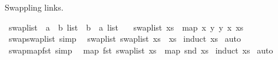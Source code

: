 \begin{isabellebody}
\begin{isamarkuptext}
Swappling links.%
\end{isamarkuptext}\isamarkuptrue%
\isamarkupfalse%
\ swap{\isacharunderscore}{\kern0pt}list\ {\isacharcolon}{\kern0pt}{\isacharcolon}{\kern0pt}\ {\isachardoublequoteopen}{\isacharparenleft}{\kern0pt}{\isacharprime}{\kern0pt}a\ {\isacharasterisk}{\kern0pt}\ {\isacharprime}{\kern0pt}b{\isacharparenright}{\kern0pt}\ list\ {\isacharequal}{\kern0pt}{\isachargreater}{\kern0pt}\ {\isacharparenleft}{\kern0pt}{\isacharprime}{\kern0pt}b\ {\isacharasterisk}{\kern0pt}\ {\isacharprime}{\kern0pt}a{\isacharparenright}{\kern0pt}\ list{\isachardoublequoteclose}\isanewline
\ \ \ {\isachardoublequoteopen}swap{\isacharunderscore}{\kern0pt}list\ xs\ {\isasymequiv}\ map\ {\isacharparenleft}{\kern0pt}{\isasymlambda}{\isacharparenleft}{\kern0pt}x{\isacharcomma}{\kern0pt}\ y{\isacharparenright}{\kern0pt}{\isachardot}{\kern0pt}\ {\isacharparenleft}{\kern0pt}y{\isacharcomma}{\kern0pt}\ x{\isacharparenright}{\kern0pt}{\isacharparenright}{\kern0pt}\ xs{\isachardoublequoteclose}\isanewline
\isanewline
{}\isamarkupfalse%
\ swap{\isacharunderscore}{\kern0pt}swap{\isacharunderscore}{\kern0pt}list\ {\isacharbrackleft}{\kern0pt}simp{\isacharbrackright}{\kern0pt}{\isacharcolon}{\kern0pt}\isanewline
\ \ {\isachardoublequoteopen}swap{\isacharunderscore}{\kern0pt}list\ {\isacharparenleft}{\kern0pt}swap{\isacharunderscore}{\kern0pt}list\ xs{\isacharparenright}{\kern0pt}\ {\isacharequal}{\kern0pt}\ xs{\isachardoublequoteclose}\isanewline
%
\isadelimproof
%
\endisadelimproof
%
\isatagproof
{}\isamarkupfalse%
\ {\isacharparenleft}{\kern0pt}induct\ xs{\isacharparenright}{\kern0pt}\isanewline
{}\isamarkupfalse%
\ auto%
\endisatagproof
{\isafoldproof}%
%
\isadelimproof
\isanewline
%
\endisadelimproof
\isanewline
{}\isamarkupfalse%
\ swap{\isacharunderscore}{\kern0pt}map{\isacharunderscore}{\kern0pt}fst\ {\isacharbrackleft}{\kern0pt}simp{\isacharbrackright}{\kern0pt}{\isacharcolon}{\kern0pt}\isanewline
\ \ {\isachardoublequoteopen}map\ fst\ {\isacharparenleft}{\kern0pt}swap{\isacharunderscore}{\kern0pt}list\ xs{\isacharparenright}{\kern0pt}\ {\isacharequal}{\kern0pt}\ map\ snd\ xs{\isachardoublequoteclose}\isanewline
%
\isadelimproof
%
\endisadelimproof
%
\isatagproof
{}\isamarkupfalse%
\ {\isacharparenleft}{\kern0pt}induct\ xs{\isacharparenright}{\kern0pt}\isanewline
{}\isamarkupfalse%
\ auto%
\endisatagproof
{\isafoldproof}%
%
\isadelimproof
\isanewline
%
\endisadelimproof
\isanewline
\isanewline

\end{isabellebody}
